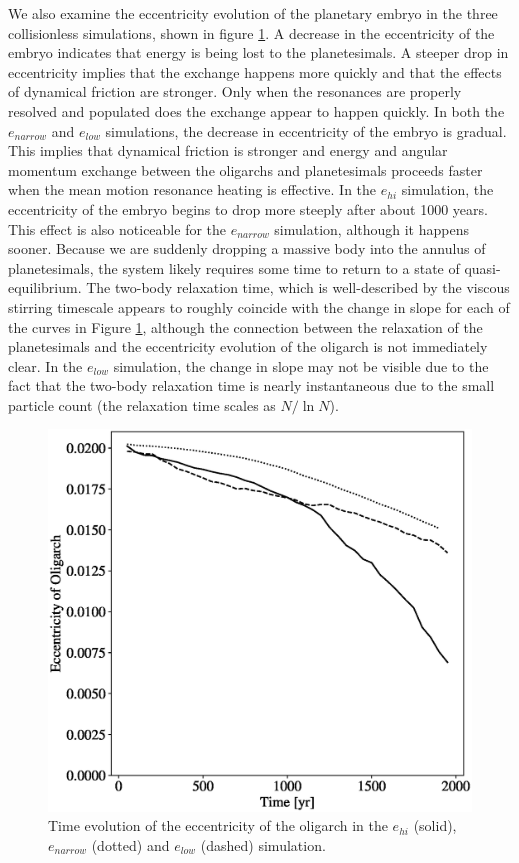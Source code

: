 We also examine the eccentricity evolution of the planetary embryo in the three collisionless simulations, shown in figure 
\ref{fig:e_oli_evo}. A decrease in the eccentricity of the embryo indicates that energy is being lost to the planetesimals. A steeper 
drop in eccentricity implies that the exchange happens more quickly and that the effects of dynamical friction are stronger. Only 
when the resonances are properly resolved and populated does the exchange appear to happen quickly. In both the $e_{narrow}
$ and $e_{low}$ simulations, the decrease in eccentricity of the embryo is gradual. This implies that dynamical friction is stronger 
and energy and angular momentum exchange between the oligarchs and planetesimals proceeds faster when the mean motion 
resonance heating is effective. In the $e_{hi}$ simulation, the eccentricity of the embryo begins to drop more steeply after about 
1000 years. This effect is also noticeable for the $e_{narrow}$ simulation, although it happens sooner. Because we are suddenly 
dropping a massive body into the annulus of planetesimals, the system likely requires some time to return to a state of quasi-
equilibrium. The two-body relaxation time, which is well-described by the viscous stirring timescale \cite{ida93} appears to 
roughly coincide with the change in slope for each of the curves in Figure \ref{fig:e_oli_evo}, although the connection between the 
relaxation of the planetesimals and the eccentricity evolution of the oligarch is not immediately clear. In the $e_{low}$ simulation, 
the change in slope may not be visible due to the fact that the two-body relaxation time is nearly instantaneous due to the small particle count (the relaxation time scales as $N / \ln N$).

\begin{figure}
    \begin{centering}
    \includegraphics[width=0.5\columnwidth]{figures/plSS/hetero_e_oli.eps}
    \caption{Time evolution of the eccentricity of the oligarch in the $e_{hi}$ (solid), $e_{narrow}$ (dotted) and $e_{low}$ (dashed) 
    simulation.}
    \label{fig:e_oli_evo}
    \end{centering}
\end{figure}

